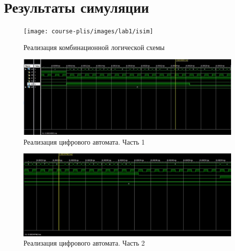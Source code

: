 \fontsize{14}{16pt}\selectfont
\chapter{\\\hspace{-6mm}Результаты симуляции}
\label{cha:appendix2}

\begin{figure}[h!]
	\centering
	\texttt{[image: course-plis/images/lab1/isim]}
	\caption{Реализация комбинационной логической схемы}
	\label{fig:1isim}
\end{figure}



\begin{figure}[h!]
	\centering
	\includegraphics[width=\linewidth]{course-plis/images/lab2/test-result2.1}
	\caption{Реализация цифрового автомата. Часть 1}
	\label{fig:2isim1}
\end{figure}

\begin{figure}[h!]
	\centering
	\includegraphics[width=\linewidth]{course-plis/images/lab2/test-result2.3}
	\caption{Реализация цифрового автомата. Часть 2}
	\label{fig:2isim2}
\end{figure}






